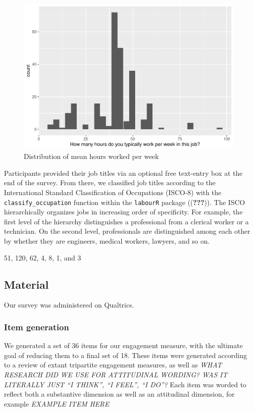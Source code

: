 \documentclass[
  english,
  man]{apa6}
\begin{document}
\begin{figure}
\centering
\includegraphics{SIOPpapaja_files/figure-latex/unnamed-chunk-2-1.pdf}
\caption{\label{fig:unnamed-chunk-2}Distribution of mean hours worked per week}
\end{figure}

Participants provided their job titles via an optional free text-entry box at the end of the survey. From there, we classified job titles according to the International Standard Classification of Occupations (ISCO-8) with the \texttt{classify\_occupation} function within the \texttt{labourR} package (({\textbf{???}})). The ISCO hierarchically organizes jobs in increasing order of specificity. For example, the first level of the hierarchy distinguishes a professional from a clerical worker or a technician. On the second level, professionals are distinguished among each other by whether they are engineers, medical workers, lawyers, and so on.

51, 120, 62, 4, 8, 1, and 3

\hypertarget{material}{%
\subsection{Material}\label{material}}

Our survey was administered on Qualtrics.

\hypertarget{item-generation}{%
\subsubsection{Item generation}\label{item-generation}}

We generated a set of 36 items for our engagement measure, with the ultimate goal of reducing them to a final set of 18. These items were generated according to a review of extant tripartite engagement measures, as well as \emph{WHAT RESEARCH DID WE USE FOR ATTITUDINAL WORDING? WAS IT LITERALLY JUST \enquote{I THINK}, \enquote{I FEEL}, \enquote{I DO}?} Each item was worded to reflect both a substantive dimension as well as an attitudinal dimension, for example \emph{EXAMPLE ITEM HERE}
\end{document}
